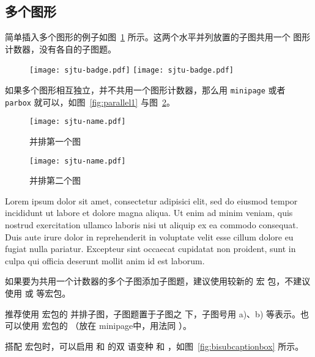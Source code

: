 \subsection{多个图形}

简单插入多个图形的例子如图~\ref{fig:SRR} 所示。这两个水平并列放置的子图共用一个
图形计数器，没有各自的子图题。

\begin{figure}[!htp]
  \centering
  \texttt{[image: sjtu-badge.pdf]}
  \hspace{1cm}
  \texttt{[image: sjtu-badge.pdf]}
  \label{fig:SRR}
\end{figure}

如果多个图形相互独立，并不共用一个图形计数器，那么用 \texttt{minipage} 或者
\texttt{parbox} 就可以，如图~\ref{fig:parallel1} 与图~\ref{fig:parallel2}。

\begin{figure}[!htp]
\begin{minipage}{0.48\textwidth}
  \centering
  \texttt{[image: sjtu-name.pdf]}
  \caption{并排第一个图}
  \label{fig:parallel1}
\end{minipage}\hfill
\begin{minipage}{0.48\textwidth}
  \centering
  \texttt{[image: sjtu-name.pdf]}
  \caption{并排第二个图}
  \label{fig:parallel2}
\end{minipage}
\end{figure}

Lorem ipsum dolor sit amet, consectetur adipisici elit, sed do eiusmod tempor
incididunt ut labore et dolore magna aliqua. Ut enim ad minim veniam, quis
nostrud exercitation ullamco laboris nisi ut aliquip ex ea commodo consequat.
Duis aute irure dolor in reprehenderit in voluptate velit esse cillum dolore eu
fugiat nulla pariatur. Excepteur sint occaecat cupidatat non proident, sunt in
culpa qui officia deserunt mollit anim id est laborum.

如果要为共用一个计数器的多个子图添加子图题，建议使用较新的 宏
包，不建议使用  或  等宏包。

推荐使用  宏包的  并排子图，子图题置于子图之
下，子图号用 a)、b) 等表示。也可以使用  宏包的 
（放在 minipage中，用法同 ）。

搭配  宏包时，可以启用  和  的双
语变种  和 ，如图~\ref{fig:bisubcaptionbox}
所示。

